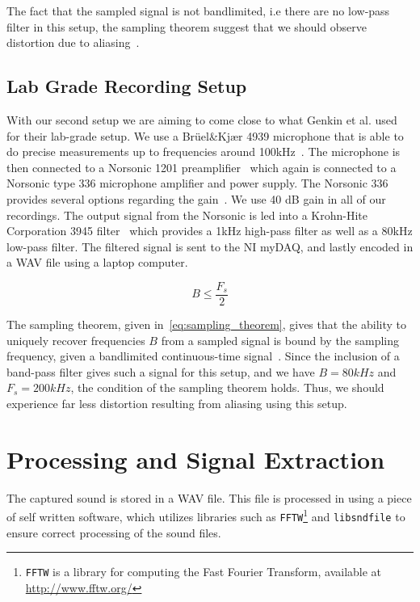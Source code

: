 The fact that the sampled signal is not bandlimited, i.e there are no low-pass filter in this setup, the sampling theorem suggest that we should observe distortion due to aliasing~\cite[pp. 384-394]{proakis2007digital}.

\subsection{Lab Grade Recording Setup}\label{chp3:sec:bruel_kjaer_configuration}
With our second setup we are aiming to come close to what Genkin et al. used for their lab-grade setup.
We use a Brüel\&Kjær 4939 microphone that is able to do precise measurements up to frequencies around 100kHz~\cite{url:bk4939_spec}.
The microphone is then connected to a Norsonic 1201 preamplifier~\cite{url:norsonic1201_spec} which again is connected to a Norsonic type 336 microphone amplifier and power supply.
The Norsonic 336 provides several options regarding the gain~\cite{url:nor336_spec}. 
We use 40 dB gain in all of our recordings.
The output signal from the Norsonic is led into a Krohn-Hite Corporation 3945 filter~\cite{url:krohn-hite3945_spec} which provides a 1kHz high-pass filter as well as a 80kHz low-pass filter.
The filtered signal is sent to the \gls{NI} myDAQ, and lastly encoded in a \gls{WAV} file using a laptop computer. 

\begin{equation}\label{eq:sampling_theorem}
B \leq \frac{F_{s}}{2}
\end{equation}

The sampling theorem, given in~\autoref{eq:sampling_theorem}, gives that the ability to uniquely recover frequencies $B$ from a sampled signal is bound by the sampling frequency, given a bandlimited continuous-time signal~\cite[pp. 384-394]{proakis2007digital}.
Since the inclusion of a band-pass filter gives such a signal for this setup, and we have $B = 80kHz$ and $F_s = 200kHz$, the condition of the sampling theorem holds.
Thus, we should experience far less distortion resulting from aliasing using this setup.


\section{Processing and Signal Extraction}\label{chp3:sec:processing_signal_extraction}
The captured sound is stored in a \gls{WAV} file.
This file is processed in using a piece of self written software, which utilizes libraries such as \texttt{FFTW}\footnote{\texttt{FFTW} is a library for computing the Fast Fourier Transform, available at \url{http://www.fftw.org/}} and \texttt{libsndfile}\footnotemark{} to ensure correct processing of the sound files.

